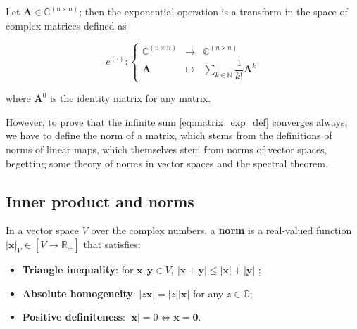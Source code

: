 \begin{definition}\label{def:matrix_exp}
	Let $\mathbf{A}\in \mathbb{C}^{\left(n\times n\right)}$; then the exponential operation is a transform in the space of complex matrices defined as

\begin{equation} e^{\left(\cdot\right)}: \left\{\begin{array}{rcl} \mathbb{C}^{\left(n\times n\right)} &\to& \mathbb{C}^{\left(n\times n\right)} \\[3mm] \mathbf{A} &\mapsto&  \displaystyle\sum\limits_{k\in\mathbb{N}} \dfrac{1}{k!} \mathbf{A}^k\end{array}\right.\end{equation}

	\noindent where $\mathbf{A}^0$ is the identity matrix for any matrix.
\end{definition}

	However, to prove that the infinite sum \eqref{eq:matrix_exp_def} converges always, we have to define the norm of a matrix, which stems from the definitions of norms of linear maps, which themselves stem from norms of vector spaces, begetting some theory of norms in vector spaces and the spectral theorem.

\subsection{Inner product and norms}\label{subsec:inner_prod_norms}

\begin{definition}\label{def:norm_vecspaece} In a vector space $V$ over the complex numbers, a \textbf{norm} is a real-valued function $\left\lvert \mathbf{x}\right\rvert_V\in\left[V\to\mathbb{R}_+\right]$ that satisfies:
\begin{itemize}
	\item \textbf{Triangle inequality}: for $\mathbf{x,y}\in V,\ \left\lvert \mathbf{x} + \mathbf{y}\right\rvert \leq \left\lvert\mathbf{x}\right\rvert + \left\lvert\mathbf{y}\right\rvert$ ;
	\item \textbf{Absolute homogeneity}: $\left\lvert z\mathbf{x}\right\rvert = \left\lvert z\right\rvert \left\lvert\mathbf{x}\right\rvert$ for any $z\in\mathbb{C}$;
	\item \textbf{Positive definiteness}: $\left\lvert \mathbf{x}\right\rvert = 0 \Leftrightarrow \mathbf{x} = \mathbf{0}$.
\end{itemize}
\end{definition}

